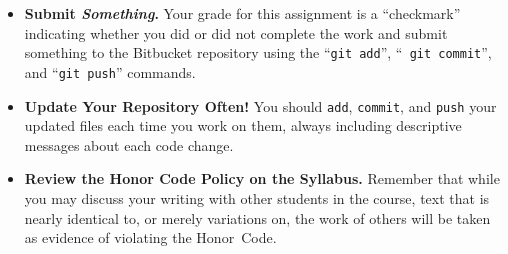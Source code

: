 \begin{itemize}


\item {\bf Submit \textbf{\textit{Something}}.} Your grade for this assignment is a ``checkmark'' indicating whether you
  did or did not complete the work and submit something to the Bitbucket repository using the ``{\tt git add}'', ``{\tt
    git commit}'', and ``{\tt git push}'' commands.




\item {\bf Update Your Repository Often!} You should {\tt add}, {\tt commit}, and {\tt push} your updated files each
  time you work on them, always including descriptive messages about each code change.

\item {\bf Review the Honor Code Policy on the Syllabus.} Remember that while you may discuss your writing with other
  students in the course, text that is nearly identical to, or merely variations on, the work of others will be
  taken as evidence of violating the \mbox{Honor Code}.

\end{itemize}

